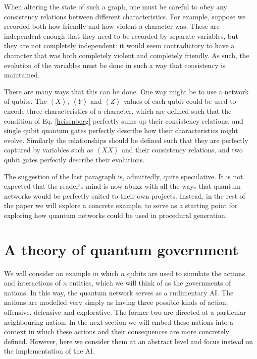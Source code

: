 \documentclass[conference]{IEEEtran}
\begin{document}
When altering the state of such a graph, one must be careful to obey any consistency relations between different characteristics. For example, suppose we recorded both how friendly and how violent a character was. These are independent enough that they need to be recorded by separate variables, but they are not completely independent: it would seem contradictory to have a character that was both completely violent and completely friendly. As such, the evolution of the variables must be done in such a way that consistency is maintained.

There are many ways that this can be done. One way might be to use a network of qubits. The $\left\langle X\right\rangle$, $\left\langle Y\right\rangle$ and $\left\langle Z\right\rangle$  values of each qubit could be used to encode three characteristics of a character, which are defined such that the condition of Eq. \ref{heisenberg} perfectly sums up their consistency relations, and single qubit quantum gates perfectly describe how their characteristics might evolve. Similarly the relationships should be defined such that they are perfectly captured by variables such as $\left\langle XX \right\rangle$ and their consistency relations, and two qubit gates perfectly describe their evolutions.

The suggestion of the last paragraph is, admittedly, quite speculative. It is not expected that the reader's mind is now abuzz with all the ways that quantum networks would be perfectly suited to their own projects. Instead, in the rest of the paper we will explore a concrete example, to serve as a starting point for exploring how quantum networks could be used in procedural generation.

\section{A theory of quantum government}

We will consider an example in which $n$ qubits are used to simulate the actions and interactions of $n$ entities, which we will think of as the governments of nations. In this way, the quantum network serves as a rudimentary AI. The nations are modelled very simply as having three possible kinds of action: offensive, defensive and explorative. The former two are directed at a particular neighbouring nation. In the next section we will embed these nations into a context in which these actions and their consequences are more concretely defined. However, here we consider them at an abstract level and focus instead on the implementation of the AI.
\end{document}
